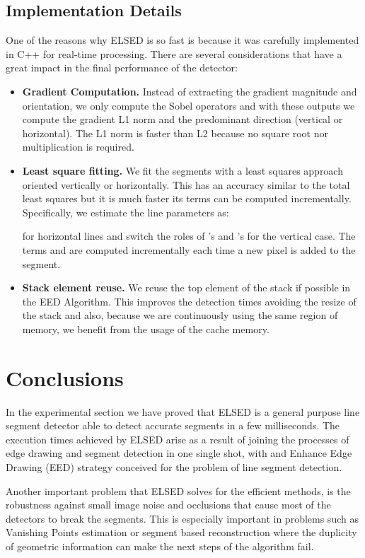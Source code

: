 \documentclass[preprint,12pt]{elsarticle}
\begin{document}
\subsection{Implementation Details}
\label{sec:implementation}
One of the reasons why ELSED is so fast is because it was carefully implemented in C++ for real-time processing. There are several considerations that have a great impact in the final performance of the detector:
\begin{itemize}
    \item \textbf{Gradient Computation.} Instead of extracting the gradient magnitude and orientation, we only compute the Sobel operators and with these outputs we compute the gradient L1 norm and the predominant direction (vertical or horizontal). The L1 norm is faster than L2 because no square root nor multiplication is required.
    \item \textbf{Least square fitting.} We fit the segments with a least squares approach oriented vertically or horizontally. This has an accuracy similar to the total least squares but it is much faster its terms can be computed incrementally. Specifically, we estimate the line parameters as:
    
    for horizontal lines and switch the roles of 's and 's for the vertical case. The terms  and   are computed incrementally each time a new pixel is added to the segment.
    
    \item \textbf{Stack element reuse.} We reuse the top element of the stack if possible in the EED Algorithm. This improves the detection times avoiding the resize of the stack and also, because we are continuously using the same region of memory, we benefit from the usage of the cache memory. 
\end{itemize}


\section{Conclusions}
\label{sec:conclusion}

In the experimental section we have proved that ELSED is a general purpose line segment detector able to detect accurate segments in a few milliseconds.
The execution times achieved by ELSED arise as a result of joining the processes of edge drawing and segment detection in one single shot, with and Enhance Edge Drawing (EED) strategy conceived for the problem of line segment detection.

Another important problem that ELSED solves for the efficient methods, is the robustness against small image noise and occlusions that cause most of the detectors to break the segments. This is especially important in problems such as Vanishing Points estimation or segment based reconstruction where the duplicity of geometric information can make the next steps of the algorithm fail.
\end{document}
